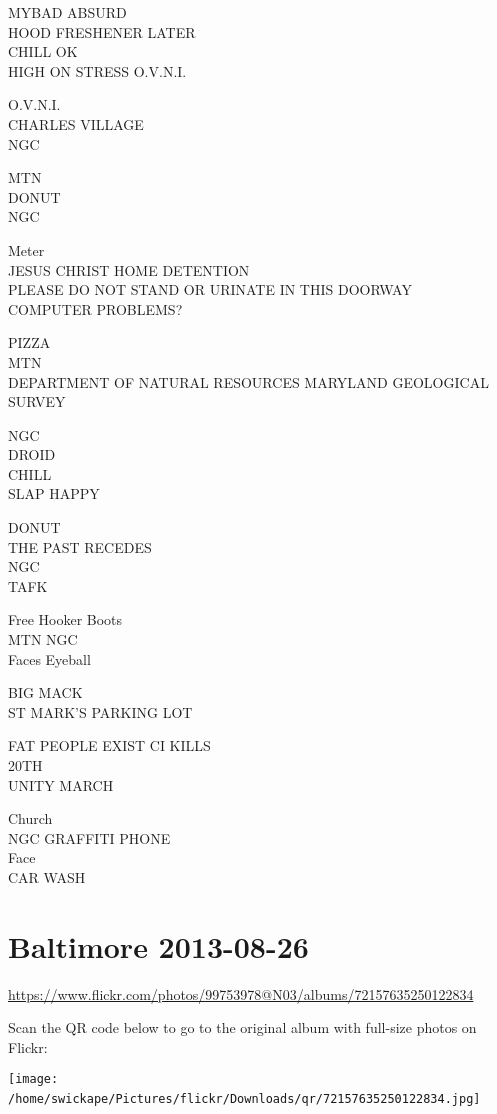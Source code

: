 \documentclass[10pt,letterpaper]{article}
\begin{document}
MYBAD ABSURD\\
HOOD FRESHENER LATER\\
CHILL OK\\
HIGH ON STRESS O.V.N.I.

O.V.N.I.\\
CHARLES VILLAGE\\
NGC

MTN\\
DONUT\\
NGC

Meter\\
JESUS CHRIST HOME DETENTION\\
PLEASE DO NOT STAND OR URINATE IN THIS DOORWAY\\
COMPUTER PROBLEMS?

PIZZA\\
MTN\\
DEPARTMENT OF NATURAL RESOURCES MARYLAND GEOLOGICAL SURVEY

NGC\\
DROID\\
CHILL\\
SLAP HAPPY

DONUT\\
THE PAST RECEDES\\
NGC\\
TAFK

Free Hooker Boots\\
MTN NGC\\
Faces Eyeball

BIG MACK\\
ST MARK'S PARKING LOT

FAT PEOPLE EXIST CI KILLS\\
20TH\\
UNITY MARCH

Church\\
NGC GRAFFITI PHONE\\
Face\\
CAR WASH
\

\section*{Baltimore 2013-08-26}

\url{https://www.flickr.com/photos/99753978@N03/albums/72157635250122834}

Scan the QR code below to go to the original album with full-size photos on Flickr:

\texttt{[image: /home/swickape/Pictures/flickr/Downloads/qr/72157635250122834.jpg]}
\
\end{document}
